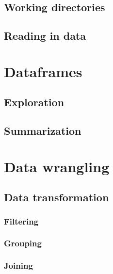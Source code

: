 \documentclass[
]{book}
\begin{document}
\hypertarget{working-directories}{%
\section{Working directories}\label{working-directories}}

\hypertarget{reading-in-data}{%
\section{Reading in data}\label{reading-in-data}}

\hypertarget{dataframes}{%
\chapter{Dataframes}\label{dataframes}}

\hypertarget{exploration}{%
\section{Exploration}\label{exploration}}

\hypertarget{summarization}{%
\section{Summarization}\label{summarization}}

\hypertarget{data-wrangling}{%
\chapter{Data wrangling}\label{data-wrangling}}

\hypertarget{data-transformation}{%
\section{Data transformation}\label{data-transformation}}

\hypertarget{filtering}{%
\subsection{Filtering}\label{filtering}}

\hypertarget{grouping}{%
\subsection{Grouping}\label{grouping}}

\hypertarget{joining}{%
\subsection{Joining}\label{joining}}
\end{document}
